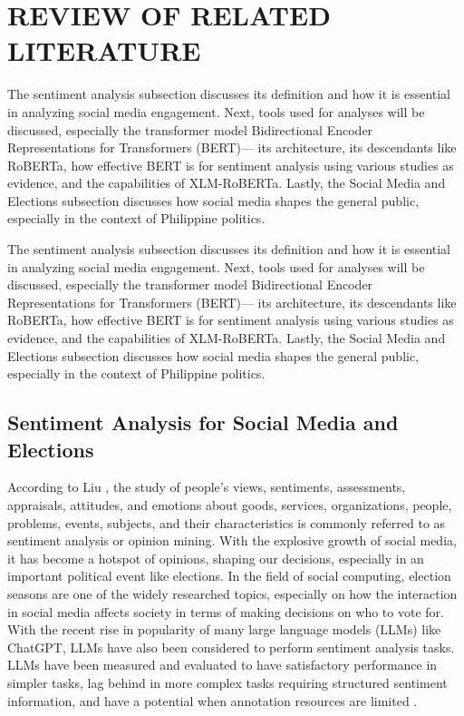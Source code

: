 \chapter{REVIEW OF RELATED LITERATURE}
The sentiment analysis subsection discusses its definition and how it is essential in analyzing social media engagement. Next, tools used for analyses will be discussed, especially the transformer model Bidirectional Encoder Representations for Transformers (BERT)--- its architecture, its descendants like RoBERTa, how effective BERT is for sentiment analysis using various studies as evidence, and the capabilities of XLM-RoBERTa. Lastly, the Social Media and Elections subsection discusses how social media shapes the general public, especially in the context of Philippine politics.

The sentiment analysis subsection discusses its definition and how it is essential in analyzing social media engagement. Next, tools used for analyses will be discussed, especially the transformer model Bidirectional Encoder Representations for Transformers (BERT)--- its architecture, its descendants like RoBERTa, how effective BERT is for sentiment analysis using various studies as evidence, and the capabilities of XLM-RoBERTa. Lastly, the Social Media and Elections subsection discusses how social media shapes the general public, especially in the context of Philippine politics. 

\section{Sentiment Analysis for Social Media and Elections}
According to Liu \cite{Liu-2012}, the study of people's views, sentiments, assessments, appraisals, attitudes, and emotions about goods, services, organizations, people, problems, events, subjects, and their characteristics is commonly referred to as sentiment analysis or opinion mining. With the explosive growth of social media, it has become a hotspot of opinions, shaping our decisions, especially in an important political event like elections. In the field of social computing, election seasons are one of the widely researched topics, especially on how the interaction in social media affects society in terms of making decisions on who to vote for. With the recent rise in popularity of many large language models (LLMs) like ChatGPT, LLMs have also been considered to perform sentiment analysis tasks. LLMs have been measured and evaluated to have satisfactory performance in simpler tasks, lag behind in more complex tasks requiring structured sentiment information, and have a potential when annotation resources are limited \cite{Liu-2023}.

